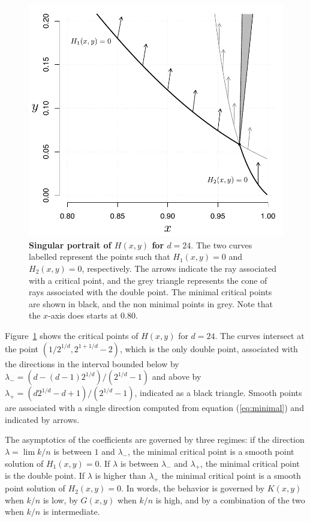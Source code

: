 \documentclass{article}
\begin{document}
\begin{figure}[h]
\centering
\includegraphics[scale=0.55]{Fig5.pdf}
\caption{\textbf{Singular portrait of $H(x,y)$ for $d=24$}. The two curves
labelled represent the points such that $H_1(x,y) = 0$ and $H_2(x,y) = 0$,
respectively. The arrows indicate the ray associated with a critical
point, and the grey triangle represents the cone of rays associated with
the double point. The minimal critical points are shown in black, and the
non minimal points in grey. Note that the $x$-axis does starts at 0.80.}
\label{fig:singular}
\end{figure}

Figure~\ref{fig:singular} shows the critical points of $H(x,y)$ for
$d=24$. The curves intersect at the point $\left( 1/2^{1/d}, 2^{1+1/d}-2
\right)$, which is the only double point, associated with the directions
in the interval bounded below by $\lambda_- = (d-(d-1)2^{1/d}) /
(2^{1/d}-1)$ and above by $\lambda_+ = (d2^{1/d}-d+1) / (2^{1/d}-1)$,
indicated as a black triangle.  Smooth points are associated with a single
direction computed from equation (\ref{eq:minimal}) and indicated by
arrows.

The asymptotics of the coefficients are governed by three regimes: if the
direction $\lambda = \lim k/n$ is between $1$ and $\lambda_-$, the minimal
critical point is a smooth point solution of $H_1(x,y) = 0$. If $\lambda$
is between $\lambda_-$ and $\lambda_+$, the minimal critical point is the
double point. If $\lambda$ is higher than $\lambda_+$ the minimal critical
point is a smooth point solution of $H_2(x,y) = 0$. In words, the behavior
is governed by $K(x,y)$ when $k/n$ is low, by $G(x,y)$ when $k/n$ is high,
and by a combination of the two when $k/n$ is intermediate.
\end{document}
